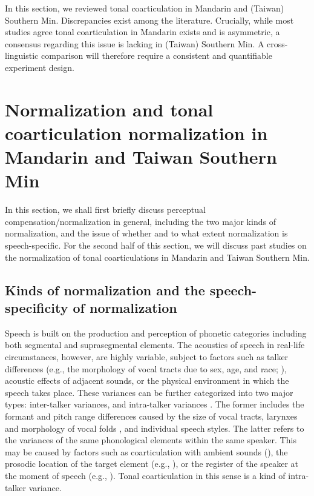 \documentclass[12pt]{report}
\begin{document}
\begin{CJK}{UTF8}{bsmi}
In this section, we reviewed tonal coarticulation in Mandarin and (Taiwan) Southern Min. Discrepancies exist among the literature. Crucially, while most studies agree tonal coarticulation in Mandarin exists and is asymmetric, a consensus regarding this issue is lacking in (Taiwan) Southern Min. A cross-linguistic comparison will therefore require a consistent and quantifiable experiment design.

\section{Normalization and tonal coarticulation normalization in Mandarin and Taiwan Southern Min}

In this section, we shall first briefly discuss perceptual compensation/normalization in general, including the two major kinds of normalization, and the issue of whether and to what extent normalization is speech-specific. For the second half of this section, we will discuss past studies on the normalization of tonal coarticulations in Mandarin and Taiwan Southern Min.

\subsection{Kinds of normalization and the speech-specificity of normalization}\label{section:Kinds of normalization and the speech-specificity of normalization}

Speech is built on the production and perception of phonetic categories including both segmental and suprasegmental elements. The acoustics of speech in real-life circumstances, however, are highly variable, subject to factors such as talker differences (e.g., the morphology of vocal tracts due to sex, age, and race; \citealp{Markovaetal2016}), acoustic effects of adjacent sounds, or the physical environment in which the speech takes place. These variances can be further categorized into two major types: inter-talker variances, and intra-talker variances \citep{Francisetal2003}. The former includes the formant and pitch range differences caused by the size of vocal tracts, larynxes and morphology of vocal folds \citep{JohnsonSjerps2018}, and individual speech styles. The latter refers to the variances of the same phonological elements within the same speaker. This may be caused by factors such as coarticulation with ambient sounds (\citealp{WangFillmore1961}), the prosodic location of the target element (e.g., \citealp{Peng1997}), or the register of the speaker at the moment of speech (e.g., \citealp{Schaferetal2000}). Tonal coarticulation in this sense is a kind of intra-talker variance.


\end{CJK}
\end{document}
